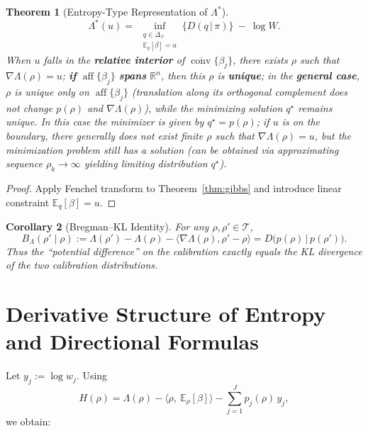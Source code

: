 \documentclass[11pt,a4paper]{article}
\newtheorem{theorem}{Theorem}[section]
\newtheorem{corollary}[theorem]{Corollary}
\theoremstyle{remark}
\DeclareMathOperator{\conv}{conv}
\DeclareMathOperator{\aff}{aff}
\begin{document}
\begin{theorem}[Entropy-Type Representation of $\Lambda^\ast$]\label{thm:dual_entropy}
\begin{equation}
\Lambda^\ast(u)=\ \inf_{\substack{q\in\Delta_J\\ \mathbb{E}_q[\beta]=u}}\Big\{D(q\,|\,\pi)\Big\}\ -\ \log W.
\end{equation}
When $u$ falls in the \textbf{relative interior} of $\overline{\conv}\{\beta_j\}$, there exists $\rho$ such that $\nabla\Lambda(\rho)=u$; \textbf{if} $\aff\{\beta_j\}$ \textbf{spans} $\mathbb{R}^n$, then this $\rho$ is \textbf{unique}; in the \textbf{general case}, $\rho$ is unique only on $\aff\{\beta_j\}$ (translation along its orthogonal complement does not change $p(\rho)$ and $\nabla\Lambda(\rho)$), while the minimizing solution $q^\star$ remains unique. In this case the minimizer is given by $q^\star=p(\rho)$; if $u$ is on the boundary, there generally does not exist finite $\rho$ such that $\nabla\Lambda(\rho)=u$, but the minimization problem still has a solution (can be obtained via approximating sequence $\rho_k\to\infty$ yielding limiting distribution $q^\star$).
\end{theorem}

\begin{proof}
Apply Fenchel transform to Theorem~\ref{thm:gibbs} and introduce linear constraint $\mathbb{E}_q[\beta]=u$.
\end{proof}

\begin{corollary}[Bregman--KL Identity]\label{cor:bregman}
For any $\rho,\rho'\in\mathcal{T}$,
\begin{equation}
B_\Lambda(\rho'\mid\rho):=\Lambda(\rho')-\Lambda(\rho)-\langle \nabla\Lambda(\rho),\rho'-\rho\rangle
= D\big(p(\rho)\,|\,p(\rho')\big).
\end{equation}
Thus the ``potential difference'' on the calibration exactly equals the KL divergence of the two calibration distributions.
\end{corollary}

\section{Derivative Structure of Entropy and Directional Formulas}\label{sec:entropy_derivative}

Let $y_j:=\log w_j$. Using
\begin{equation}
H(\rho)=\Lambda(\rho)-\big\langle \rho,\ \mathbb{E}_\rho[\beta]\big\rangle-\sum_{j=1}^J p_j(\rho)\,y_j,
\end{equation}
we obtain:
\end{document}
